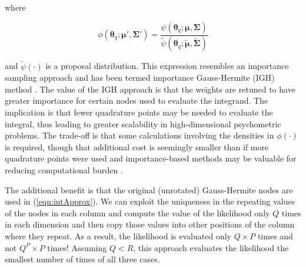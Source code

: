 \documentclass[12pt]{article}
\begin{document}
\noindent where

\begin{equation}
\label{eqn:mixing}
\phi(\boldsymbol{\theta}_q;\boldsymbol{\mu}',\boldsymbol{\Sigma'}) = \frac{\psi(\boldsymbol{\theta}_q;\boldsymbol{\mu},\boldsymbol{\Sigma})}{\widetilde{\psi}(\boldsymbol{\theta}_q;\widetilde{\boldsymbol{\mu}},\widetilde{\boldsymbol{\Sigma}})}
\end{equation}

\noindent and $\widetilde{\psi}(\cdot)$ is a proposal distribution. This expression resembles an importance sampling approach \cite{gelman} and has been termed importance Gauss-Hermite (IGH) method \cite{elvira}. The value of the IGH approach is that the weights are retuned to have greater importance for certain nodes used to evaluate the integrand. The implication is that fewer quadrature points may be needed to evaluate the integral, thus leading to greater scalability in high-dimensional psychometric problems. The trade-off is that some calculations involving the densities in $\phi(\cdot)$ is required, though that additional cost is seemingly smaller than if more quadrature points were used and importance-based methods may be valuable for reducing computational burden \cite{Ackerberg}. 

The additional benefit is that the original (unrotated) Gauss-Hermite nodes are used in (\ref{eqn:intApprox}). We can exploit the uniqueness in the repeating values of the nodes in each column and compute the value of the likelihood only $Q$ times in each dimension and then copy those values into other positions of the column where they repeat. As a result, the likelihood is evaluated only $Q \times P$ times and not $Q^P \times P$ times! Assuming $Q < R$, this approach evaluates the likelihood the smallest number of times of all three cases. 


\end{document}

